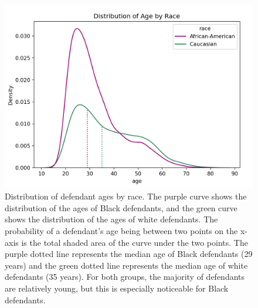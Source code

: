\documentclass[water,article,submit,moreauthors,pdftex]{mdpi}
\begin{document}
\begin{figure}

{\centering \includegraphics[width=1\linewidth]{../images/age_race_plot_new} 

}

\caption{Distribution of defendant ages by race. The purple curve shows the distribution of the ages of Black defendants, and the green curve shows the distribution of the ages of white defendants. The probability of a defendant's age being between two points on the x-axis is the total shaded area of the curve under the two points. The purple dotted line represents the median age of Black defendants (29 years) and the green dotted line represents the median age of white defendants (35 years). For both groups, the majority of defendants are relatively young, but this is especially noticeable for Black defendants.}\label{fig:age plot}
\end{figure}
\end{document}
